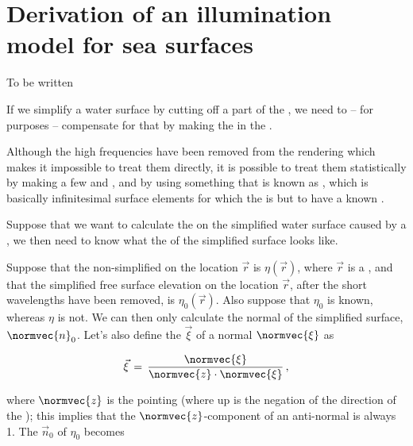 \chapter{Derivation of an illumination model for sea surfaces}
\label{chap:illumination_model_derivation}

To be written \comment
{
If we simplify a water surface by cutting off a part of the , we need to -- for \rendering purposes -- compensate for that by making the  in the  .

Although the high frequencies have been removed from the rendering which makes it impossible to treat them directly, it is possible to treat them statistically by making a few \assumptions and \approximations, and by using something that is known as \microfacets, which is basically infinitesimal surface elements for which the  is \stochastic but \assumed to have a known .

\HRule

Suppose that we want to calculate the \shading on the simplified water surface caused by a , we then need to know what the  of the simplified surface looks like.

Suppose that the non-simplified  on the location $\vec{r}$ is $\eta(\vec{r})$, where $\vec{r}$ is a , and that the simplified free surface elevation on the location $\vec{r}$, after the short wavelengths have been removed, is $\eta_0(\vec{r})$. Also suppose that $\eta_0$ is known, whereas $\eta$ is not. We can then only calculate the normal of the simplified surface, $\normvec{n}_0$. Let's also define the  $\vec{\xi}$ of a normal $\normvec{\xi}$ as

\begin{equation}
\vec{\xi} \,=\, \frac{\normvec{\xi}}{\normvec{z}\cdot\normvec{\xi}}\,,
\end{equation}

where $\normvec{z}$ is the  pointing \up (where up is the negation of the direction of the ); this implies that the $\normvec{z}$-component of an anti-normal is always 1. The  $\vec{n}_0$ of $\eta_0$ becomes

}
